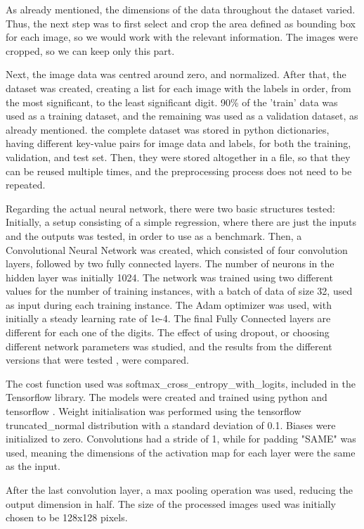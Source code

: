 \documentclass[final,12p,times]{elsarticle}
\begin{document}
As already mentioned, the dimensions of the data throughout the dataset varied.
Thus, the next step was to first select and crop the area defined as bounding box for each image, so we would work with the relevant information.
The images were cropped, so we can keep only this part.

Next, the image data was centred around zero, and normalized.
After that, the dataset was created, creating a list for each image with the labels in order, from the most significant, to the least significant digit.
90\% of the 'train' data was used as a training dataset, and the remaining was used as a validation dataset, as already mentioned.
the complete dataset was stored in python dictionaries, having different key-value pairs for image data and labels, for both the training, validation, and test set.
Then, they were stored altogether in a file, so that they can be reused multiple times, and the preprocessing process does not need to be repeated.

Regarding the actual neural network, there were two basic structures tested:
Initially, a setup consisting of a simple regression, where there are just the inputs and the outputs was tested, in order to use as a benchmark.
Then, a Convolutional Neural Network was created, which consisted of four convolution layers, followed by two fully connected layers.
The number of neurons in the hidden layer was initially 1024.
The network was trained using two different values for the number of training instances, with a batch of data of size 32, used as input during each training instance.
The Adam optimizer was used, with initially a steady learning rate of 1e-4.
The final Fully Connected layers are different for each one of the digits.
The effect of using dropout, or choosing different network parameters was studied, and the results from the different versions that were tested , were compared.

The cost function used was softmax\_cross\_entropy\_with\_logits, included in the Tensorflow library.
The models were created and trained using python \cite{python} and tensorflow \cite{45166}.
Weight initialisation was performed using the tensorflow truncated\_normal distribution with a standard deviation of 0.1.
Biases were initialized to zero.
Convolutions had a stride of 1, while for padding "SAME" was used, meaning the dimensions of the activation map for each layer were the same as the input.

After the last convolution layer, a max pooling operation was used, reducing the output dimension in half.
The size of the processed images used was initially chosen to be 128x128 pixels.
\end{document}
